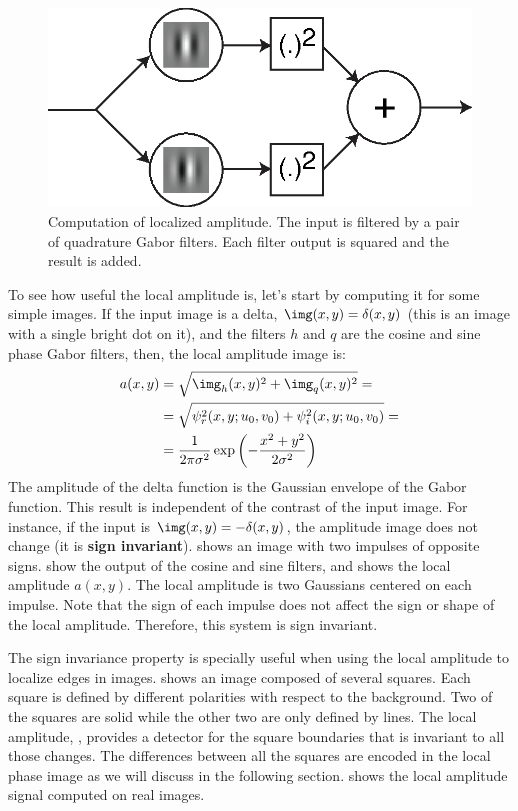 \begin{figure}[t]
\centerline{
\includegraphics[width=0.5\linewidth]{figures/spatial_filter_sets/gabor_magnitude.eps}}
\caption{Computation of localized amplitude. The input is filtered by a pair of quadrature Gabor filters. Each filter output is squared and the result is added.} 
\label{fig:quad2}
\end{figure}

To see how useful the local amplitude is, let's start by computing it for some simple images. If the input image is a delta, $\img(x,y) = \delta(x,y)$ (this is an image with a single bright dot on it), and the filters $h$ and $q$ are the cosine and sine phase Gabor filters, then, the local amplitude image is:
\begin{equation}
\begin{split}
a(x,y)  & = \sqrt{\img_h(x,y)^2 + \img_q(x,y)^2} = \\ 
 & = \sqrt{\psi^2_r(x,y;u_0,v_0) + \psi^2_i(x,y;u_0,v_0)} = \\
 & = \frac{1}{2\pi \sigma^2} \exp{\left(-\frac{x^2 + y^2}{2 \sigma^2} \right)}
\end{split}
\end{equation}
The amplitude of the delta function is the Gaussian envelope of the Gabor function. This result is independent of the contrast of the input image. For instance, if the input is $\img(x,y) = -\delta(x,y)$, the amplitude image does not change (it is {\bf sign invariant}).  shows an image with two impulses of opposite signs.  show the output of the cosine and sine filters, and  shows the local amplitude $a(x,y)$. The local amplitude is two Gaussians centered on each impulse. Note that the sign of each impulse does not affect the sign or shape of the local amplitude. Therefore, this system is sign invariant. 

The sign invariance property is specially useful when using the local amplitude to localize edges in images.   shows an image composed of several squares. Each square is defined by different polarities with respect to the background. Two of the squares are solid while the other two are only defined by lines. The local amplitude, , provides a detector for the square boundaries that is invariant to all those changes. The differences between all the squares are encoded in the local phase image as we will discuss in the following section. \Fig{\ref{fig:gabor_zebra}} shows the local amplitude signal computed on real images. 

